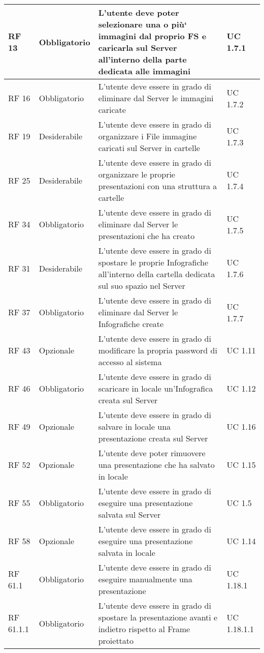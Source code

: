 {\begin{longtable} [c]{| p{2.5cm} | p{2.5cm} | p{6cm} |p{2.5cm}|}
		\hline
		RF 13 & Obbligatorio & L’utente deve poter selezionare una o più` immagini dal proprio FS e caricarla sul Server\ped{g} all’interno della parte dedicata alle immagini & UC 1.7.1\\
		\hline
		RF 16 & Obbligatorio & L’utente deve essere in grado di eliminare dal Server\ped{g} le immagini caricate & UC 1.7.2\\			
		\hline
		RF 19 & Desiderabile & L'utente deve essere in grado di organizzare i File\ped{g} immagine caricati sul Server\ped{g} in cartelle & UC 1.7.3\\
		\hline
		RF 25 & Desiderabile & L'utente deve essere in grado di organizzare le proprie presentazioni con una struttura a cartelle & UC 1.7.4\\
		\hline
		RF 34 & Obbligatorio & L’utente deve essere in grado di eliminare dal Server\ped{g} le presentazioni che ha creato  & UC 1.7.5\\
		\hline
		RF 31 & Desiderabile & L'utente deve essere in grado di spostare le proprie Infografiche\ped{g} all’interno della cartella dedicata sul suo spazio nel Server\ped{g} & UC 1.7.6\\
		\hline
		RF 37 & Obbligatorio & L’utente deve essere in grado di eliminare dal Server\ped{g} le Infografiche\ped{g} create & UC 1.7.7\\
		\hline
		RF 43 & Opzionale & L'utente deve essere in grado di modificare la propria password di accesso al sistema & UC 1.11\\						
		\hline
		RF 46 & Obbligatorio & L'utente deve essere in grado di scaricare in locale un’Infografica\ped{g} creata sul Server\ped{g} & UC 1.12\\
		\hline
		RF 49 & Opzionale & L'utente deve essere in grado di salvare in locale una presentazione creata sul Server\ped{g} & UC 1.16\\
		\hline
		RF 52 & Opzionale & L’utente deve poter rimuovere una presentazione che ha salvato in locale & UC 1.15\\
		\hline
		RF 55 & Obbligatorio & L'utente deve essere in grado di eseguire una presentazione salvata sul Server\ped{g} & UC 1.5\\
		\hline
		RF 58 & Opzionale & L'utente deve essere in grado di eseguire una presentazione salvata in locale & UC 1.14\\
		\hline
		RF 61.1 & Obbligatorio & L'utente deve essere in grado di eseguire manualmente una presentazione & UC 1.18.1\\
		\hline
		RF 61.1.1 & Obbligatorio & L'utente deve essere in grado di spostare la presentazione avanti e indietro rispetto al Frame\ped{g} proiettato & UC 1.18.1.1\\

\end{longtable}}
